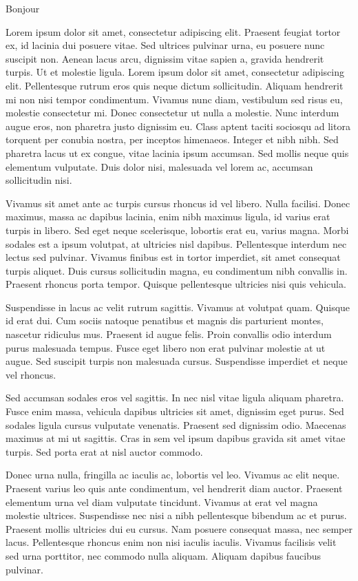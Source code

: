 \ifcourt

Bonjour

\else

Lorem ipsum dolor sit amet, consectetur adipiscing elit. Praesent feugiat tortor ex, id lacinia dui posuere vitae. Sed ultrices pulvinar urna, eu posuere nunc suscipit non. Aenean lacus arcu, dignissim vitae sapien a, gravida hendrerit turpis. Ut et molestie ligula. Lorem ipsum dolor sit amet, consectetur adipiscing elit. Pellentesque rutrum eros quis neque dictum sollicitudin. Aliquam hendrerit mi non nisi tempor condimentum. Vivamus nunc diam, vestibulum sed risus eu, molestie consectetur mi. Donec consectetur ut nulla a molestie. Nunc interdum augue eros, non pharetra justo dignissim eu. Class aptent taciti sociosqu ad litora torquent per conubia nostra, per inceptos himenaeos. Integer et nibh nibh. Sed pharetra lacus ut ex congue, vitae lacinia ipsum accumsan. Sed mollis neque quis elementum vulputate. Duis dolor nisi, malesuada vel lorem ac, accumsan sollicitudin nisi.

Vivamus sit amet ante ac turpis cursus rhoncus id vel libero. Nulla facilisi. Donec maximus, massa ac dapibus lacinia, enim nibh maximus ligula, id varius erat turpis in libero. Sed eget neque scelerisque, lobortis erat eu, varius magna. Morbi sodales est a ipsum volutpat, at ultricies nisl dapibus. Pellentesque interdum nec lectus sed pulvinar. Vivamus finibus est in tortor imperdiet, sit amet consequat turpis aliquet. Duis cursus sollicitudin magna, eu condimentum nibh convallis in. Praesent rhoncus porta tempor. Quisque pellentesque ultricies nisi quis vehicula.

Suspendisse in lacus ac velit rutrum sagittis. Vivamus at volutpat quam. Quisque id erat dui. Cum sociis natoque penatibus et magnis dis parturient montes, nascetur ridiculus mus. Praesent id augue felis. Proin convallis odio interdum purus malesuada tempus. Fusce eget libero non erat pulvinar molestie at ut augue. Sed suscipit turpis non malesuada cursus. Suspendisse imperdiet et neque vel rhoncus.

Sed accumsan sodales eros vel sagittis. In nec nisl vitae ligula aliquam pharetra. Fusce enim massa, vehicula dapibus ultricies sit amet, dignissim eget purus. Sed sodales ligula cursus vulputate venenatis. Praesent sed dignissim odio. Maecenas maximus at mi ut sagittis. Cras in sem vel ipsum dapibus gravida sit amet vitae turpis. Sed porta erat at nisl auctor commodo.

Donec urna nulla, fringilla ac iaculis ac, lobortis vel leo. Vivamus ac elit neque. Praesent varius leo quis ante condimentum, vel hendrerit diam auctor. Praesent elementum urna vel diam vulputate tincidunt. Vivamus at erat vel magna molestie ultrices. Suspendisse nec nisi a nibh pellentesque bibendum ac et purus. Praesent mollis ultricies dui eu cursus. Nam posuere consequat massa, nec semper lacus. Pellentesque rhoncus enim non nisi iaculis iaculis. Vivamus facilisis velit sed urna porttitor, nec commodo nulla aliquam. Aliquam dapibus faucibus pulvinar.

\fi

